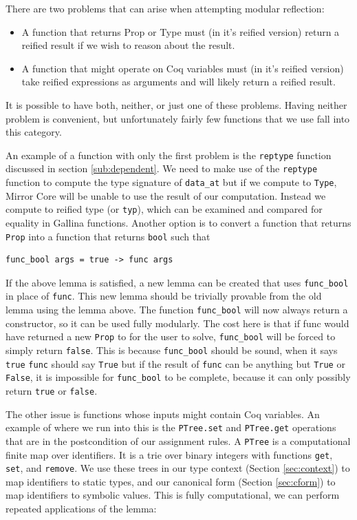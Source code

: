 \documentclass{puthesis}
\begin{document}
There are two problems that can arise when attempting modular reflection:

\begin{itemize}
\item A function that returns Prop or Type must (in it's reified version) return a reified
  result if we wish to reason about the result.
\item A function that might operate on Coq variables must (in it's
  reified version) take reified
  expressions as arguments and will likely return a reified result.
\end{itemize}

It is possible to have both, neither, or just one of these problems.
Having neither problem is convenient, but unfortunately fairly few
functions that we use fall into this category. 

An example of a function with only the first problem is the
\lstinline|reptype| function discussed in section
\ref{sub:dependent}. We need to make use of the \lstinline|reptype|
function to compute the type signature of \lstinline|data_at| but if we
compute to \lstinline|Type|, Mirror Core will be unable to use the
result of our computation. Instead we compute to reified type (or
\lstinline|typ|), which can be examined and compared for equality in
Gallina functions. Another option is to convert a function that
returns \lstinline|Prop| into a function that returns \lstinline|bool| such that

\begin{lstlisting}
func_bool args = true -> func args
\end{lstlisting}

If the above lemma is satisfied, a new lemma can be created that uses
\lstinline|func_bool| in place of \lstinline|func|. This new lemma
should be trivially provable from the old lemma using the lemma
above. The function \lstinline|func_bool| will now always return a
constructor, so it can be used fully modularly. The cost here is that
if func would have returned a new \lstinline|Prop| to for the user to
solve, \lstinline|func_bool| will be forced to simply return
\lstinline|false|. This is because \lstinline|func_bool| should be
sound, when it says \lstinline|true| \lstinline|func| should say
\lstinline|True| but if the result of \lstinline|func| can be anything
but \lstinline|True| or \lstinline|False|, it is impossible for
\lstinline|func_bool| to be complete, because it can only possibly
return \lstinline|true| or \lstinline|false|.

The other issue is functions whose inputs might contain Coq
variables. An example of where we run into this is the
\lstinline|PTree.set| and \lstinline|PTree.get| operations that are in
the postcondition of our assignment rules. A \lstinline|PTree| is a
computational finite map over identifiers. It is a trie over binary
integers with functions \lstinline|get|, \lstinline|set|, and
\lstinline|remove|. We use these trees in our type context (Section
\ref{sec:context}) to map identifiers to static types, and our
canonical form (Section \ref{sec:cform}) to map identifiers to
symbolic values. This is fully computational, we can perform repeated
applications of the lemma:
\end{document}
